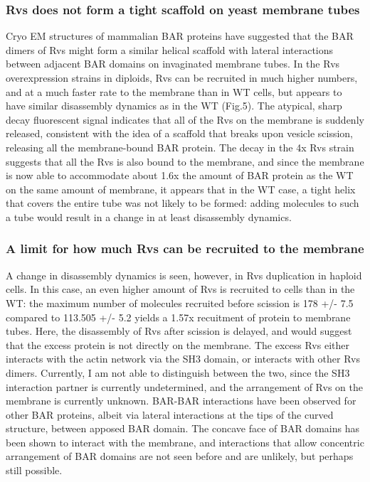 \subsubsection{Rvs does not form a tight scaffold on yeast membrane tubes}
Cryo EM structures of mammalian BAR proteins have suggested that the BAR dimers of Rvs might form a similar helical scaffold with lateral interactions between adjacent BAR domains on invaginated membrane tubes. In the Rvs overexpression strains in diploids, Rvs can be recruited in much higher numbers, and at a much faster rate to the membrane than in WT cells, but appears to have similar disassembly dynamics as in the WT (Fig.5). The atypical, sharp decay fluorescent signal indicates that all of the Rvs on the membrane is suddenly released, consistent with the idea of a scaffold that breaks upon vesicle scission, releasing all the membrane-bound BAR protein. The decay in the 4x Rvs strain suggests that all the Rvs is also bound to the membrane, and since the membrane is now able to accommodate about 1.6x the amount of BAR protein as the WT on the same amount of membrane, it appears that in the WT case, a tight helix that covers the entire tube was not likely to be formed: adding molecules to such a tube would result in a change in at least disassembly dynamics.

\subsubsection{A limit for how much Rvs can be recruited to the membrane}
A change in disassembly dynamics is seen, however, in Rvs duplication in haploid cells. In this case, an even higher amount of Rvs is recruited to cells than in the WT: the maximum number of molecules recruited before scission is 178 +/- 7.5 compared to 113.505 +/- 5.2 yields a 1.57x recuitment of protein to membrane tubes. Here, the disassembly of Rvs after scission is delayed, and would suggest that the excess protein is not directly on the membrane. The excess Rvs either interacts with the actin network via the SH3 domain, or interacts with other Rvs dimers. Currently, I am not able to distinguish between the two, since the SH3 interaction partner is currently undetermined, and the arrangement of Rvs on the membrane is currently unknown. BAR-BAR interactions have been observed for other BAR proteins, albeit via lateral interactions at the tips of the curved structure, between apposed BAR domain. The concave face of BAR domains has been shown to interact with the membrane, and interactions that allow concentric arrangement of BAR domains are not seen before and are unlikely, but perhaps still possible.

